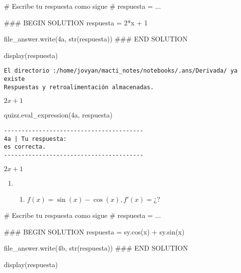 \documentclass[
  letterpaper,
  DIV=11,
  numbers=noendperiod]{scrreprt}
\newenvironment{Shaded}{\begin{snugshade}}{\end{snugshade}}
\newcommand{\BuiltInTok}[1]{\textcolor[rgb]{0.00,0.23,0.31}{#1}}
\newcommand{\CommentTok}[1]{\textcolor[rgb]{0.37,0.37,0.37}{#1}}
\newcommand{\DecValTok}[1]{\textcolor[rgb]{0.68,0.00,0.00}{#1}}
\newcommand{\NormalTok}[1]{\textcolor[rgb]{0.00,0.23,0.31}{#1}}
\newcommand{\OperatorTok}[1]{\textcolor[rgb]{0.37,0.37,0.37}{#1}}
\newcommand{\RegionMarkerTok}[1]{\textcolor[rgb]{0.00,0.23,0.31}{#1}}
\newcommand{\StringTok}[1]{\textcolor[rgb]{0.13,0.47,0.30}{#1}}
\providecommand{\tightlist}{%
  \setlength{\itemsep}{0pt}\setlength{\parskip}{0pt}}\usepackage{longtable,booktabs,array}
\begin{document}
\begin{Shaded}
\begin{Highlighting}[]
\CommentTok{\# Escribe tu respuesta como sigue }
\CommentTok{\# respuesta = ...}

\CommentTok{\#\#\# }\RegionMarkerTok{BEGIN}\CommentTok{ SOLUTION}
\NormalTok{respuesta }\OperatorTok{=} \DecValTok{2}\OperatorTok{*}\NormalTok{x }\OperatorTok{+} \DecValTok{1}

\NormalTok{file\_answer.write(}\StringTok{\textquotesingle{}4a\textquotesingle{}}\NormalTok{, }\BuiltInTok{str}\NormalTok{(respuesta))}
\CommentTok{\#\#\# }\RegionMarkerTok{END}\CommentTok{ SOLUTION}

\NormalTok{display(respuesta)}
\end{Highlighting}
\end{Shaded}

\begin{verbatim}
El directorio :/home/jovyan/macti_notes/notebooks/.ans/Derivada/ ya existe
Respuestas y retroalimentación almacenadas.
\end{verbatim}

$\displaystyle 2 x + 1$

\begin{Shaded}
\begin{Highlighting}[]
\NormalTok{quizz.eval\_expression(}\StringTok{\textquotesingle{}4a\textquotesingle{}}\NormalTok{, respuesta)}
\end{Highlighting}
\end{Shaded}

\begin{verbatim}
----------------------------------------
4a | Tu respuesta:
es correcta.
----------------------------------------
\end{verbatim}

$\displaystyle 2 x + 1$

\begin{enumerate}
\def\labelenumi{\arabic{enumi}.}
\setcounter{enumi}{3}
\tightlist
\item
  \begin{enumerate}
  \def\labelenumii{\alph{enumii}.}
  \setcounter{enumii}{1}
  \tightlist
  \item
    \(f(x) = \sin(x)-\cos(x), f'(x) = ¿?\)
  \end{enumerate}
\end{enumerate}

\begin{Shaded}
\begin{Highlighting}[]
\CommentTok{\# Escribe tu respuesta como sigue }
\CommentTok{\# respuesta = ...}

\CommentTok{\#\#\# }\RegionMarkerTok{BEGIN}\CommentTok{ SOLUTION}
\NormalTok{respuesta }\OperatorTok{=}\NormalTok{ sy.cos(x) }\OperatorTok{+}\NormalTok{ sy.sin(x)}

\NormalTok{file\_answer.write(}\StringTok{\textquotesingle{}4b\textquotesingle{}}\NormalTok{, }\BuiltInTok{str}\NormalTok{(respuesta))}
\CommentTok{\#\#\# }\RegionMarkerTok{END}\CommentTok{ SOLUTION}

\NormalTok{display(respuesta)}
\end{Highlighting}
\end{Shaded}
\end{document}
